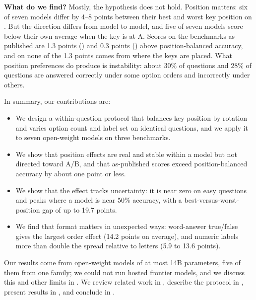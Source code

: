 {\bf What do we find?}
Mostly, the hypothesis does not hold.
Position matters: six of seven models differ by 4--8 points between their best and worst key position on \mmlu.
But the direction differs from model to model, and five of seven models score below their own average when the key is at A.
Scores on the benchmarks as published are 1.3 points (\mmlu) and 0.3 points (\csqa) above position-balanced accuracy, and on \mmlu none of the 1.3 points comes from where the keys are placed.
What position preferences do produce is instability: about 30\% of \mmlu questions and 28\% of \csqa questions are answered correctly under some option orders and incorrectly under others.

In summary, our contributions are:
\begin{itemize}[leftmargin=*,itemsep=0pt,topsep=0pt]
    \item We design a within-question protocol that balances key position by rotation and varies option count and label set on identical questions, and we apply it to seven open-weight models on three benchmarks.
    \item We show that position effects are real and stable within a model but not directed toward A/B, and that as-published scores exceed position-balanced accuracy by about one point or less.
    \item We show that the effect tracks uncertainty: it is near zero on easy questions and peaks where a model is near 50\% accuracy, with a best-versus-worst-position gap of up to 19.7 points.
    \item We find that format matters in unexpected ways: word-answer true/false gives the largest order effect (14.2 points on average), and numeric labels more than double the spread relative to letters (5.9 to 13.6 points).
\end{itemize}

Our results come from open-weight models of at most 14B parameters, five of them from one family; we could not run hosted frontier models, and we discuss this and other limits in .
We review related work in , describe the protocol in , present results in , and conclude in .
